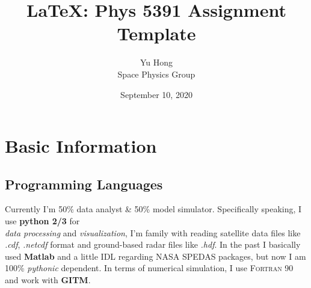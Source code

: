 \documentclass[12pt, letterpaper]{article} %
\begin{document}
\title{\LaTeX: Phys 5391 Assignment Template} %
\author{Yu Hong\\Space Physics Group} %
\date{September 10, 2020}  %
\maketitle %
\newpage %
\tableofcontents %
\newpage %
\linenumbers %






\section{Basic Information} %
\subsection{Programming Languages} %
Currently I'm 50\% data \vspace{3mm} analyst \& 50\% model \hspace{5mm} simulator. %
Specifically speaking, I use \textbf{python 2/3} for  \\ %
\textit{data processing} and \emph{visualization}, I'm family with  %
reading satellite data files like \textit{.cdf}, \textit{.netcdf} format and ground-based radar files like \textit{.hdf}. 
In the past I basically used \textbf{Matlab} and a little \textsf{IDL} regarding NASA SPEDAS packages, but now I 
am 100\% \textit{pythonic} dependent. In terms of numerical simulation, I use \textsc{Fortran 90} and work with \textbf{GITM}. 
\end{document}

